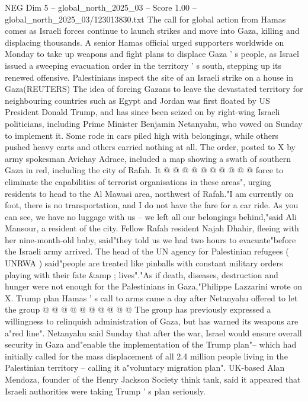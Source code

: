 \begin{textsample}{NEG Dim 5 – global\_north\_2025\_03 – Score 1.00 – global\_north\_2025\_03/123013830.txt}  \label{ex:f5_neg_295}
The call for global action from Hamas comes as Israeli forces continue to launch strikes and move into Gaza, killing and displacing thousands.
A senior Hamas official urged supporters worldwide on Monday to take up weapons and fight plans to displace Gaza ' s people, as Israel issued a sweeping evacuation order in the territory ' s south, stepping up its renewed offensive.
Palestinians inspect the site of an Israeli strike on a house in Gaza(REUTERS) The idea of forcing Gazans to leave the devastated territory for neighbouring countries such as Egypt and Jordan was first floated by US President Donald Trump, and has since been seized on by right-wing Israeli politicians, including Prime Minister Benjamin Netanyahu, who vowed on Sunday to implement it.
Some rode in cars piled high with belongings, while others pushed heavy carts and others carried nothing at all.
The order, posted to X by army spokesman Avichay Adraee, included a map showing a swath of southern Gaza in red, including the city of Rafah.
It @ @ @ @ @ @ @ @ @ @ force to eliminate the capabilities of terrorist organisations in these areas", urging residents to head to the Al Mawasi area, northwest of Rafah."I am currently on foot, there is no transportation, and I do not have the fare for a car ride.
As you can see, we have no luggage with us -- we left all our belongings behind,"said Ali Mansour, a resident of the city.
Fellow Rafah resident Najah Dhahir, fleeing with her nine-month-old baby, said"they told us we had two hours to evacuate"before the Israeli army arrived.
The head of the UN agency for Palestinian refugees ( UNRWA ) said"people are treated like pinballs with constant military orders playing with their fate \&amp ; lives"."As if death, diseases, destruction and hunger were not enough for the Palestinians in Gaza,"Philippe Lazzarini wrote on X.
Trump plan Hamas ' s call to arms came a day after Netanyahu offered to let the group @ @ @ @ @ @ @ @ @ @ The group has previously expressed a willingness to relinquish administration of Gaza, but has warned its weapons are a"red line".
Netanyahu said Sunday that after the war, Israel would ensure overall security in Gaza and"enable the implementation of the Trump plan"-- which had initially called for the mass displacement of all 2.4 million people living in the Palestinian territory -- calling it a"voluntary migration plan".
UK-based Alan Mendoza, founder of the Henry Jackson Society think tank, said it appeared that Israeli authorities were taking Trump ' s plan seriously.

\end{textsample}
